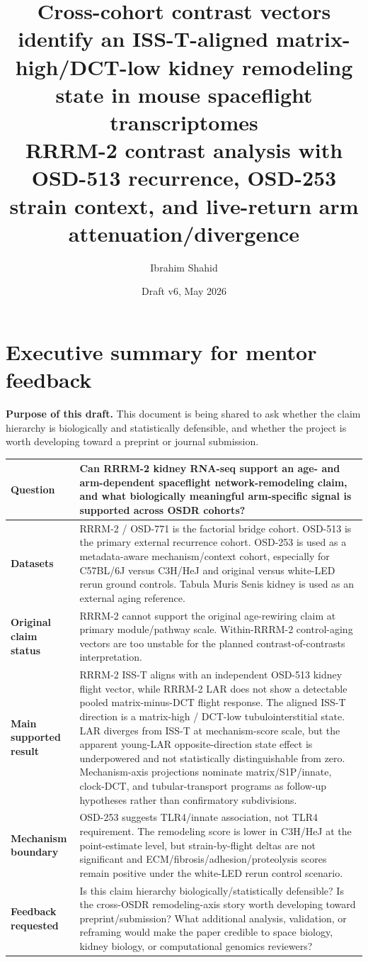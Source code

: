 \documentclass[11pt]{article}
\title{\textbf{Cross-cohort contrast vectors identify an ISS-T-aligned matrix-high/DCT-low kidney remodeling state in mouse spaceflight transcriptomes}\\[0.35em]
\large RRRM-2 contrast analysis with OSD-513 recurrence, OSD-253 strain context, and live-return arm attenuation/divergence}
\author{Ibrahim Shahid}
\affil{Independent research draft for mentor feedback\\Authorship/collaboration structure pending}
\date{Draft v6, May 2026}
\begin{document}
\maketitle

\section*{Executive summary for mentor feedback}

\noindent\textbf{Purpose of this draft.} This document is being shared to ask whether the claim hierarchy is biologically and statistically defensible, and whether the project is worth developing toward a preprint or journal submission.

\vspace{0.6em}
\small
\begin{tabularx}{\textwidth}{>{\bfseries}p{}X}
\toprule
Question & Can RRRM-2 kidney RNA-seq support an age- and arm-dependent spaceflight network-remodeling claim, and what biologically meaningful arm-specific signal is supported across OSDR cohorts? \\
\midrule
Datasets & RRRM-2 / OSD-771 is the factorial bridge cohort. OSD-513 is the primary external recurrence cohort. OSD-253 is used as a metadata-aware mechanism/context cohort, especially for C57BL/6J versus C3H/HeJ and original versus white-LED rerun ground controls. Tabula Muris Senis kidney is used as an external aging reference. \\
\midrule
Original claim status & RRRM-2 cannot support the original age-rewiring claim at primary module/pathway scale. Within-RRRM-2 control-aging vectors are too unstable for the planned contrast-of-contrasts interpretation. \\
\midrule
Main supported result & RRRM-2 ISS-T aligns with an independent OSD-513 kidney flight vector, while RRRM-2 LAR does not show a detectable pooled matrix-minus-DCT flight response. The aligned ISS-T direction is a matrix-high / DCT-low tubulointerstitial state. LAR diverges from ISS-T at mechanism-score scale, but the apparent young-LAR opposite-direction state effect is underpowered and not statistically distinguishable from zero. Mechanism-axis projections nominate matrix/S1P/innate, clock-DCT, and tubular-transport programs as follow-up hypotheses rather than confirmatory subdivisions. \\
\midrule
Mechanism boundary & OSD-253 suggests TLR4/innate association, not TLR4 requirement. The remodeling score is lower in C3H/HeJ at the point-estimate level, but strain-by-flight deltas are not significant and ECM/fibrosis/adhesion/proteolysis scores remain positive under the white-LED rerun control scenario. \\
\midrule
Feedback requested & Is this claim hierarchy biologically/statistically defensible? Is the cross-OSDR remodeling-axis story worth developing toward preprint/submission? What additional analysis, validation, or reframing would make the paper credible to space biology, kidney biology, or computational genomics reviewers? \\
\bottomrule
\end{tabularx}
\normalsize
\end{document}
